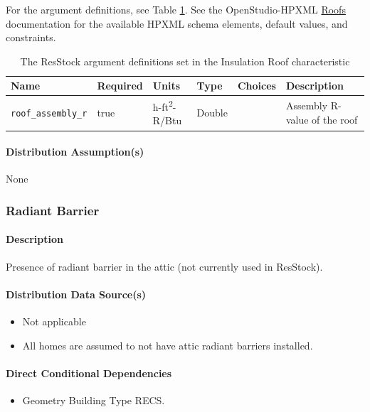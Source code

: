 For the argument definitions, see Table \ref{table:hc_arg_def_ins_roof}. See the OpenStudio-HPXML \href{https://openstudio-hpxml.readthedocs.io/en/v1.8.1/workflow_inputs.html#hpxml-roofs}{Roofs} documentation for the available HPXML schema elements, default values, and constraints.

\begin{longtable}[]{|p{3.5cm}|p{1.5cm}|p{1.3cm}|p{1.1cm}|p{}|p{3.3cm}|} \caption{The ResStock argument definitions set in the Insulation Roof characteristic} \label{table:hc_arg_def_ins_roof} \\
\toprule\noalign{}
Name & Required & Units & Type & Choices & Description \\
\midrule\noalign{}
\endhead
\bottomrule\noalign{}
\endlastfoot
\texttt{roof\_assembly\_r} & true & h-ft\textsuperscript{2}-R/Btu & Double & &
Assembly R-value of the roof \\
\end{longtable}

\paragraph{Distribution Assumption(s)}
None
\subsubsection{Radiant Barrier}\label{radiant_barrier}
\paragraph{Description}

Presence of radiant barrier in the attic (not currently used in
ResStock).
\paragraph{Distribution Data Source(s)}
\begin{itemize}
 
\item
  Not applicable
\item
  All homes are assumed to not have attic radiant barriers installed.
\end{itemize}
\paragraph{Direct Conditional Dependencies}
 
\begin{itemize}
    \item Geometry Building Type RECS.
\end{itemize}
